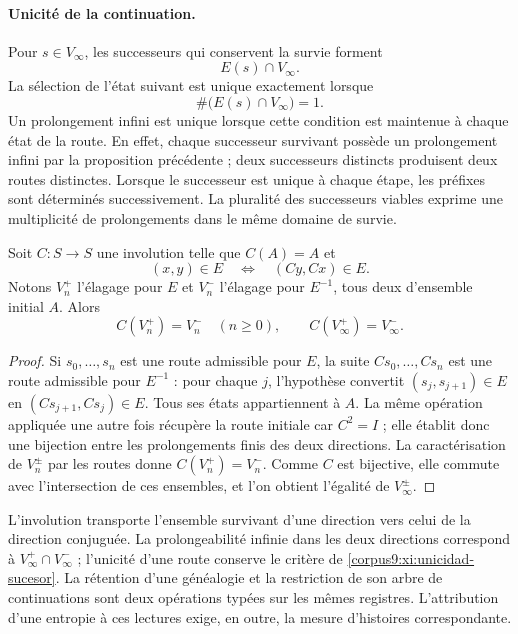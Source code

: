\paragraph{Unicité de la continuation.}
Pour \(s\in V_\infty\), les successeurs qui conservent la survie forment
\[
 E(s)\cap V_\infty.
\]
La sélection de l’état suivant est unique exactement lorsque
\begin{equation}
 \#\bigl(E(s)\cap V_\infty\bigr)=1.
 \label{corpus9:xi:unicidad-sucesor}
\end{equation}
Un prolongement infini est unique lorsque cette condition est maintenue
à chaque état de la route. En effet, chaque successeur survivant possède
un prolongement infini par la proposition précédente ; deux successeurs
distincts produisent deux routes distinctes. Lorsque le successeur est unique à
chaque étape, les préfixes sont déterminés successivement.
La pluralité des successeurs viables exprime une multiplicité de
prolongements dans le même domaine de survie.

\begin{proposition}
\label{corpus9:xi:conjugacion-supervivencia}
Soit \(C:S\to S\) une involution telle que \(C(A)=A\) et
\begin{equation}
 (x,y)\in E\quad\Longleftrightarrow\quad(Cy,Cx)\in E.
 \label{corpus9:xi:involucion-prolongaciones}
\end{equation}
Notons \(V_n^+\) l’élagage pour \(E\) et \(V_n^-\) l’élagage
pour \(E^{-1}\), tous deux d’ensemble initial \(A\). Alors
\[
 C(V_n^+)=V_n^-\quad(n\geq0),\qquad
 C(V_\infty^+)=V_\infty^-.
\]
\end{proposition}

\begin{proof}
Si \(s_0,\ldots,s_n\) est une route admissible pour \(E\), la suite
\(Cs_0,\ldots,Cs_n\) est une route admissible pour \(E^{-1}\) :
pour chaque \(j\), l’hypothèse convertit
\((s_j,s_{j+1})\in E\) en \((Cs_{j+1},Cs_j)\in E\).
Tous ses états appartiennent à \(A\). La même opération appliquée une autre
fois récupère la route initiale car \(C^2=I\) ; elle établit donc une
bijection entre les prolongements finis des deux directions.
La caractérisation de \(V_n^\pm\) par les routes donne
\(C(V_n^+)=V_n^-\). Comme \(C\) est bijective, elle commute avec
l’intersection de ces ensembles, et l’on obtient l’égalité de
\(V_\infty^\pm\).
\end{proof}

L’involution transporte l’ensemble survivant d’une direction vers celui
de la direction conjuguée. La prolongeabilité infinie dans les deux
directions correspond à \(V_\infty^+\cap V_\infty^-\) ; l’unicité
d’une route conserve le critère de
\eqref{corpus9:xi:unicidad-sucesor}. La rétention d’une généalogie
et la restriction de son arbre de continuations sont deux opérations
typées sur les mêmes registres. L’attribution d’une entropie à
ces lectures exige, en outre, la mesure d’histoires correspondante.
